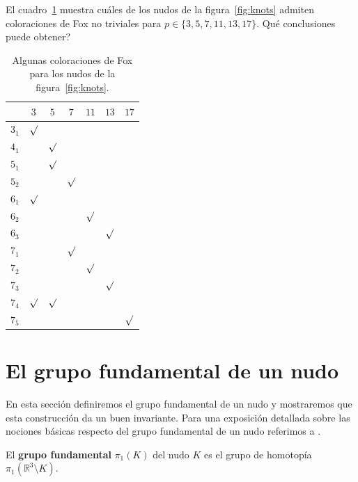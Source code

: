 \documentclass[graybox]{svmult}
\newcommand{\R}{\mathbb{R}}
\begin{document}
\begin{exercise}
    \label{exercise:colorings}
    El cuadro~\ref{tab:colorings} muestra cuáles de los nudos de la
    figura~\ref{fig:knots} admiten coloraciones de Fox no triviales para
    $p\in\{3,5,7,11,13,17\}$. \textquestiondown Qué conclusiones puede obtener? 

    \begin{table}[h]
		\centering
        \begin{tabular}{|c|c|c|c|c|c|c|}
            \hline 
            & $3$ & $5$ & $7$ & $11$ & $13$ & $17$\tabularnewline
            \hline 
            $3_{1}$ & $\surd$ &  &  &  &  & \tabularnewline
            \hline 
            $4_{1}$ &  & $\surd$ &  &  &  & \tabularnewline
            \hline 
            $5_{1}$ &  & $\surd$ &  &  &  & \tabularnewline
            \hline 
            $5_{2}$ &  &  & $\surd$ &  &  & \tabularnewline
            \hline 
            $6_{1}$ & $\surd$ &  &  &  &  & \tabularnewline
            \hline 
            $6_{2}$ &  &  &  & $\surd$ &  & \tabularnewline
            \hline 
            $6_{3}$ &  &  &  &  & $\surd$ & \tabularnewline
            \hline 
            $7_{1}$ &  &  & $\surd$ &  &  & \tabularnewline
            \hline 
            $7_{2}$ &  &  &  & $\surd$ &  & \tabularnewline
            \hline 
            $7_{3}$ &  &  &  &  & $\surd$ & \tabularnewline
            \hline 
            $7_{4}$ & $\surd$ & $\surd$ &  &  &  & \tabularnewline
            \hline 
            $7_{5}$ &  &  &  &  &  & $\surd$\tabularnewline
            \hline 
        \end{tabular}
        \caption{Algunas coloraciones de Fox para los nudos de la figura~\ref{fig:knots}.}
        \label{tab:colorings}
    \end{table}
\end{exercise}

\section{El grupo fundamental de un nudo}
\label{section:pi_1}

En esta sección definiremos el grupo fundamental de un nudo y mostraremos que
esta construcción da un buen invariante. Para una exposición detallada sobre
las nociones básicas respecto del grupo fundamental de un nudo referimos a
\cite{MR0445489}.

\begin{definition}
    El \textbf{grupo fundamental} $\pi_1(K)$ del nudo $K$ es el grupo de homotopía 
    $\pi_1(\R^3\setminus K)$. 
\end{definition}
\end{document}
